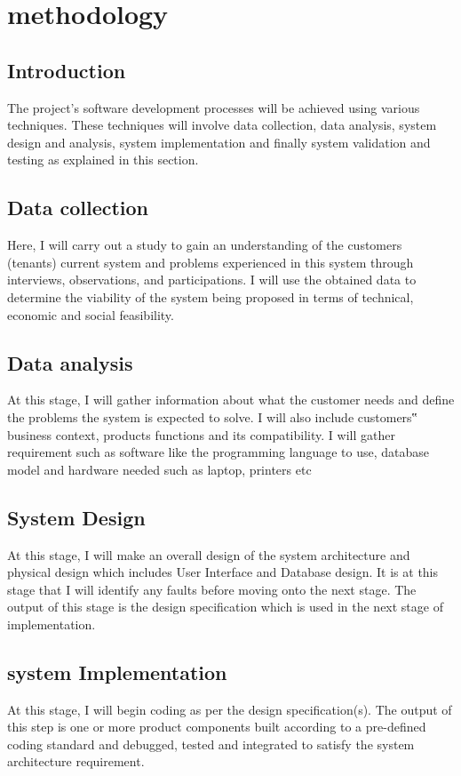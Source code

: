 \documentclass[]{report}
\begin{document}
\chapter{methodology}
\section{Introduction}
The project’s software development processes will be achieved using various techniques. These techniques will involve data collection, data analysis, system design and analysis, system implementation and finally system validation and testing as explained in this section.

\section{Data collection}
Here, I will carry out a study to gain an understanding of the customers (tenants) current system and problems experienced in this system through interviews, observations, and participations. I will use the obtained data to determine the viability of the system being proposed in terms of technical, economic and social feasibility.

\section{Data analysis}
At this stage, I will gather information about what the customer needs and define the problems the system is expected to solve. I will also include customers‟ business context, products functions and its compatibility. I will gather requirement such as software like the programming language to use, database model and hardware needed such as laptop, printers etc  
 
\section{System Design}
At this stage, I will make an overall design of the system architecture and physical design which includes User Interface and Database design. It is at this stage that I will identify any faults before moving onto the next stage. The output of this stage is the design specification which is used in the next stage of implementation. 
\section{system Implementation }
At this stage, I will begin coding as per the design specification(s). The output of this step is one or more product components built according to a pre-defined coding standard and debugged, tested and integrated to satisfy the system architecture requirement. 
\end{document}

